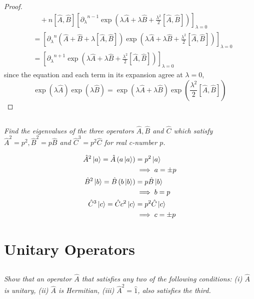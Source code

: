 \documentclass[12pt, letterpaper]{article}
\begin{document}
\begin{proof}
\begin{align*}
        & \quad+n[\hat{A}, \hat{B}]\left[{\partial_\lambda}^{n-1 } \exp \left(\lambda \hat{A}+\lambda \hat{B}+\frac{\lambda^{2}}{2}[\hat{A}, \hat{B}]\right)\right]_{\lambda=0}\\
        &= \left[{\partial_\lambda}^{n }(\hat{A}+\hat{B}+\lambda[\hat{A}, \hat{B}]) \exp \left(\lambda \hat{A}+\lambda \hat{B}+\frac{\lambda^{2}}{2}[\hat{A}, \hat{B}]\right)\right]_{\lambda=0} \\ 
        &= \left[{\partial_\lambda}^{n + 1} \exp \left(\lambda \hat{A}+\lambda \hat{B}+\frac{\lambda^{2}}{2}[\hat{A}, \hat{B}]\right)\right]_{\lambda=0}
    \end{align*}
    since the equation and each term in its expansion agree at $\lambda = 0$, 
    $$
        \boxed{\exp(\lambda \hat{A}) \exp(\lambda \hat{B})=\exp \left(\lambda \hat{A}+\lambda \hat{B} \right)  \exp \left(\frac{\lambda^{2}}{2}[\hat{A}, \hat{B}]\right)}
    $$
\end{proof}


\subsection{}
\textit{Find the eigenvalues of the three operators $\hat{A}, \hat{B}$ and $\hat{C}$ which satisfy $\hat{A}^{2}=p^{2}, \hat{B}^{2}=p \hat{B}$ and $\hat{C}^{3}=p^{2} \hat{C}$ for real c-number $p$.}

\begin{align*}
    \hat{A}^2 \ket a = \hat{A} \left(a \ket a\right)  &= p ^2 \ket a \\
    &\implies a = \pm p \\
    \hat{B}^2 \ket b = \hat{B} \left(b \ket b \right)  &= p \hat{B} \ket b \\
     &\implies b = p \\
    \hat{C}^3 \ket c=\hat{C} c^2 \ket c  &= p^2 \hat{C} \ket c \\
     &\implies c = \pm p \\
\end{align*}

\newpage
\section{Unitary Operators}
\subsection{}
\textit{Show that an operator $\hat{A}$ that satisfies any two of the following conditions: (i) $\hat{A}$ is unitary, (ii) $\hat{A}$ is Hermitian, (iii) $\hat{A}^2 =\hat{1}$, also satisfies the third. }
\end{document}
